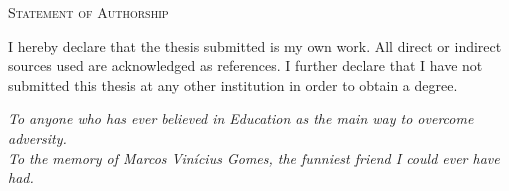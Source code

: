 \documentclass[12pt, openright, oneside, a4paper, english]{abntex2}
\begin{document}
\frenchspacing 

\pretextual

\imprimircapa
\cleardoublepage

\imprimirfolhaderosto





\newpage
\begin{center}
{\ABNTEXchapterfont\Large\textsc{Statement of Authorship}}
\end{center}

\vspace*{1cm}

I hereby declare that the thesis submitted is my own work. All direct or indirect
sources used are acknowledged as references. I further declare that I have not submitted
this thesis at any other institution in order to obtain a degree. \\



\newpage
\begin{dedicatoria}
  \vspace*{\fill}
  \centering
  \noindent
  \textit{ To anyone who has ever believed in Education as the main way to overcome adversity. } \\
  \vspace{2cm}
  \textit{ To the memory of Marcos Vinícius Gomes, the funniest friend I could ever have had. }
  \vspace*{\fill}
\end{dedicatoria}
\end{document}
